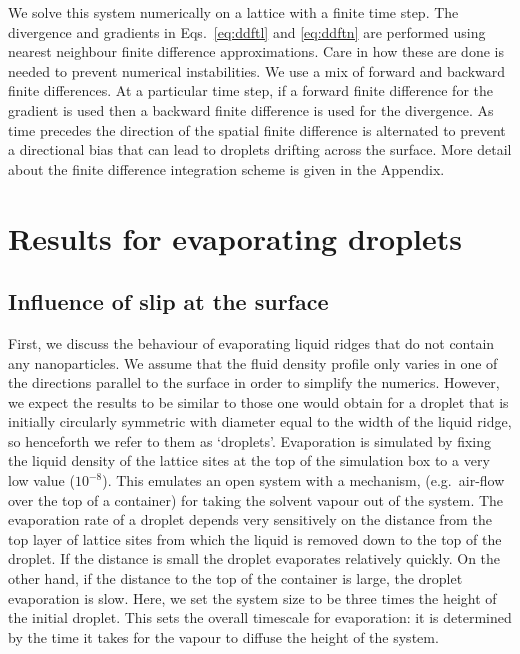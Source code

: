 \documentclass[journal=langd5,manuscript=article]{achemso}
\begin{document}
We solve this system numerically on a lattice with a finite time step. The divergence and gradients in Eqs.\ \eqref{eq:ddftl} and \eqref{eq:ddftn} are performed using nearest neighbour finite
difference approximations. Care in how these are done is needed to prevent numerical instabilities. We use a mix of
forward and backward finite differences. At a particular time step, if
a forward finite difference for the gradient is used then a backward
finite difference is used for the divergence. As time precedes the
direction of the spatial finite difference is alternated to prevent a
directional bias that can lead to droplets drifting across the surface.
More detail about the finite difference integration scheme is
given in the Appendix.

\section{Results for evaporating droplets}\label{evaporation}

\subsection{Influence of slip at the surface}

First, we discuss the behaviour of evaporating liquid ridges that
do not contain any nanoparticles.
We assume that the fluid density profile only varies in one of the
directions parallel to the surface in order to simplify the numerics.
However, we expect the results to be similar to those one would obtain for a droplet that is initially circularly symmetric with diameter equal to the width of the liquid ridge, so henceforth we refer to them as `droplets'.
Evaporation is simulated by fixing the liquid density of
the lattice sites at the top of the simulation box to a very low value
($10^{-8}$). This emulates an open system with a mechanism, (e.g.\ 
air-flow over the top of a container) for taking the solvent vapour out
of the system. The evaporation rate of a droplet depends very sensitively
on the distance from the top layer of lattice sites from which the liquid is
removed down to the top of the droplet. If the distance is
small the droplet evaporates relatively quickly. On the other hand, if the
distance to the top of the container is large, the droplet evaporation is
slow. Here, we set the system size to be
three times the height of the initial droplet. This sets the overall timescale
for evaporation: it is determined by the time it takes for the vapour to diffuse the height of the system.
\end{document}
